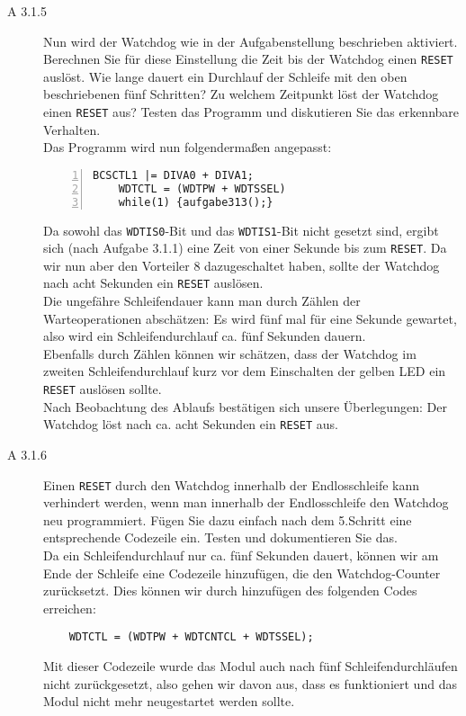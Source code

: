 \documentclass[11pt,a4paper,ngerman]{article}
\begin{document}
\begin{description}
	\item[A 3.1.5] Nun wird der Watchdog wie in der Aufgabenstellung beschrieben aktiviert. Berechnen Sie für diese Einstellung die Zeit bis der Watchdog einen \texttt{RESET} auslöst. Wie lange dauert ein Durchlauf der Schleife mit den oben beschriebenen fünf Schritten? Zu welchem Zeitpunkt löst der Watchdog einen \texttt{RESET} aus? Testen das Programm und diskutieren Sie das erkennbare Verhalten.  \\ 
	
	Das Programm wird nun folgendermaßen angepasst:
	
	\begin{lstlisting}[numbers=left]
	BCSCTL1 |= DIVA0 + DIVA1;
	WDTCTL = (WDTPW + WDTSSEL)
	while(1) {aufgabe313();}
	\end{lstlisting}
	
	Da sowohl das \texttt{WDTIS0}-Bit und das  \texttt{WDTIS1}-Bit nicht gesetzt sind, ergibt sich (nach Aufgabe 3.1.1) eine Zeit von einer Sekunde bis zum \texttt{RESET}. Da wir nun aber den Vorteiler 8 dazugeschaltet haben, sollte der Watchdog nach acht Sekunden ein \texttt{RESET} auslösen. \\
	Die ungefähre Schleifendauer kann man durch Zählen der Warteoperationen abschätzen: Es wird fünf mal für eine Sekunde gewartet, also wird ein Schleifendurchlauf ca. fünf Sekunden dauern. \\
	Ebenfalls durch Zählen können wir schätzen, dass der Watchdog im zweiten Schleifendurchlauf kurz vor dem Einschalten der gelben LED ein \texttt{RESET} auslösen sollte.\\
	Nach Beobachtung des Ablaufs bestätigen sich unsere Überlegungen: Der Watchdog löst nach ca. acht Sekunden ein \texttt{RESET} aus.
	
	
	\item[A 3.1.6] Einen \texttt{RESET} durch den Watchdog innerhalb der Endlosschleife kann verhindert werden, wenn man innerhalb der Endlosschleife den Watchdog neu programmiert. Fügen Sie dazu einfach nach dem 5.Schritt eine entsprechende Codezeile ein. Testen und dokumentieren Sie das.   \\
	
	Da ein Schleifendurchlauf nur ca. fünf Sekunden dauert, können wir am Ende der Schleife eine Codezeile hinzufügen, die den Watchdog-Counter zurücksetzt. Dies können wir durch hinzufügen des folgenden Codes erreichen:
	
	\begin{lstlisting}
	WDTCTL = (WDTPW + WDTCNTCL + WDTSSEL);
	\end{lstlisting}
	
	Mit dieser Codezeile wurde das Modul auch nach fünf Schleifendurchläufen nicht zurückgesetzt, also gehen wir davon aus, dass es funktioniert und das Modul nicht mehr neugestartet werden sollte.
	
\end{description}
\end{document}
